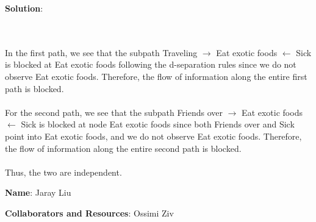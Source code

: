 \documentclass[submit]{../harvardml}
\newenvironment{solution}{
    \vspace{2mm}
    \color{blue}\noindent\textbf{Solution}:
}{}
\begin{document}
\begin{solution}
\begin{enumerate}
  \\
  \\
  In the first path, we see that the subpath Traveling $\rightarrow$ Eat exotic foods $\leftarrow$ Sick is blocked at Eat exotic foods following the d-separation rules since we do not observe Eat exotic foods. Therefore, the flow of information along the entire first path is blocked. 
  \\
  \\
  For the second path, we see that the subpath Friends over $\rightarrow$ Eat exotic foods $\leftarrow$ Sick is blocked at node Eat exotic foods since both Friends over and Sick point into Eat exotic foods, and we do not observe Eat exotic foods. Therefore, the flow of information along the entire second path is blocked. 
  \\
  \\
  Thus, the two are independent.
\end{enumerate}
\end{solution}

\newpage

\textbf{Name}: Jaray Liu

\textbf{Collaborators and Resources}: Ossimi Ziv
\end{document}
